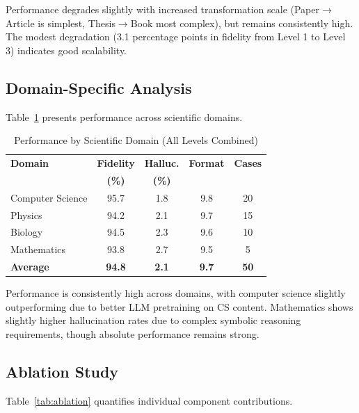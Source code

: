 \documentclass{ieeeaccess}
\begin{document}
Performance degrades slightly with increased transformation scale (Paper$\rightarrow$Article is simplest, Thesis$\rightarrow$Book most complex), but remains consistently high. The modest degradation (3.1 percentage points in fidelity from Level 1 to Level 3) indicates good scalability.

\subsection{Domain-Specific Analysis}

Table~\ref{tab:domain-results} presents performance across scientific domains.

\begin{table}[!t]
\caption{Performance by Scientific Domain (All Levels Combined)}
\label{tab:domain-results}
\centering
\renewcommand{\arraystretch}{1.2}
\footnotesize
\begin{tabular}{@{}lcccc@{}}
\toprule
\textbf{Domain} & \textbf{Fidelity} & \textbf{Halluc.} & \textbf{Format} & \textbf{Cases} \\
& \textbf{(\%)} & \textbf{(\%)} & & \\
\midrule
Computer Science & 95.7 & 1.8 & 9.8 & 20 \\
Physics & 94.2 & 2.1 & 9.7 & 15 \\
Biology & 94.5 & 2.3 & 9.6 & 10 \\
Mathematics & 93.8 & 2.7 & 9.5 & 5 \\
\midrule
\textbf{Average} & \textbf{94.8} & \textbf{2.1} & \textbf{9.7} & \textbf{50} \\
\bottomrule
\end{tabular}
\normalsize
\end{table}
Performance is consistently high across domains, with computer science slightly outperforming due to better LLM pretraining on CS content. Mathematics shows slightly higher hallucination rates due to complex symbolic reasoning requirements, though absolute performance remains strong.

\subsection{Ablation Study}

Table~\ref{tab:ablation} quantifies individual component contributions.
\end{document}
